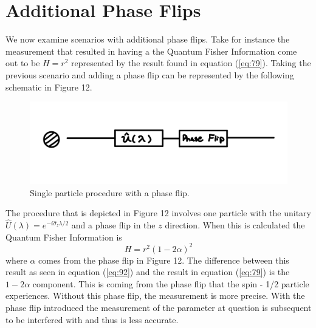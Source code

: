 \documentclass[twocolumn]{article}
\begin{document}
\section*{Additional Phase Flips}
We now examine scenarios with additional phase flips. Take for instance the measurement that resulted in having a the Quantum Fisher Information come out to be $H=r^2$ represented by the result found in equation (\ref{eq:79}). Taking the previous scenario and adding a phase flip can be represented by the following schematic in Figure 12.
\begin{figure}[h]
\begin{center}
\includegraphics[width=0.70\linewidth]{SP-Phase-Flip.PNG}
\caption{Single particle procedure with a phase flip.}
\end{center}
\end{figure}
\newline
The procedure that is depicted in Figure 12 involves one particle with the unitary $\hat{U}(\lambda)=e^{-i\hat{\sigma}_z\lambda/2}$ and a phase flip in the $z$ direction. When this is calculated the Quantum Fisher Information is
\begin{equation}\label{eq:92}
H=r^2(1-2\alpha)^2
\end{equation}
where $\alpha$ comes from the phase flip in Figure 12. The difference between this result as seen in equation (\ref{eq:92}) and the result in equation (\ref{eq:79}) is the $1-2\alpha$ component. This is coming from the phase flip that the spin - 1/2 particle experiences. Without this phase flip, the measurement is more precise. With the phase flip introduced the measurement of the parameter at question is subsequent to be interfered with and thus is less accurate.
\end{document}
